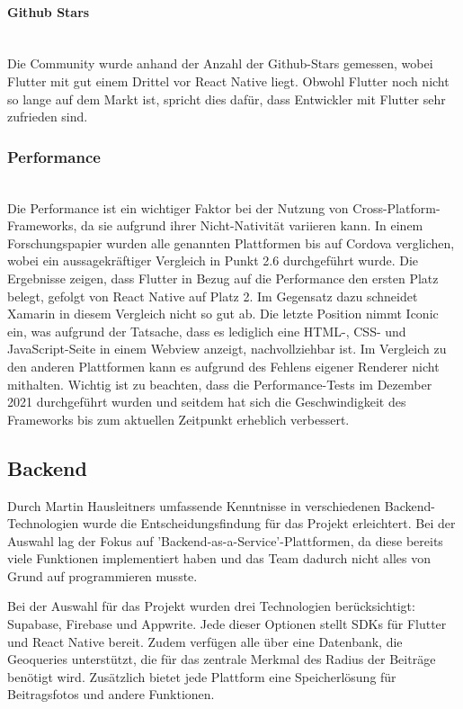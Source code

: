 \paragraph{Github Stars}\mbox{} \\
Die Community wurde anhand der Anzahl der Github-Stars gemessen, wobei Flutter mit gut einem Drittel vor React Native liegt. Obwohl Flutter noch nicht so lange auf dem Markt ist, spricht dies dafür, dass Entwickler mit Flutter sehr zufrieden sind.

\subsubsection{Performance}\mbox{} \\
Die Performance ist ein wichtiger Faktor bei der Nutzung von Cross-Platform-Frameworks, da sie aufgrund ihrer Nicht-Nativität variieren kann. In einem Forschungspapier \cite{Anwar2021} wurden alle genannten Plattformen bis auf Cordova verglichen, wobei ein aussagekräftiger Vergleich in Punkt 2.6 durchgeführt wurde. Die Ergebnisse zeigen, dass Flutter in Bezug auf die Performance den ersten Platz belegt, gefolgt von React Native auf Platz 2. Im Gegensatz dazu schneidet Xamarin in diesem Vergleich nicht so gut ab. Die letzte Position nimmt Iconic ein, was aufgrund der Tatsache, dass es lediglich eine HTML-, CSS- und JavaScript-Seite in einem Webview anzeigt, nachvollziehbar ist. Im Vergleich zu den anderen Plattformen kann es aufgrund des Fehlens eigener Renderer nicht mithalten.
Wichtig ist zu beachten, dass die Performance-Tests im Dezember 2021 durchgeführt wurden und seitdem hat sich die Geschwindigkeit des Frameworks bis zum aktuellen Zeitpunkt erheblich verbessert.


\subsection
{Backend}
Durch Martin Hausleitners umfassende Kenntnisse in verschiedenen Backend-Technologien wurde die Entscheidungsfindung für das Projekt erleichtert. Bei der Auswahl lag der Fokus auf 'Backend-as-a-Service'-Plattformen, da diese bereits viele Funktionen implementiert haben und das Team dadurch nicht alles von Grund auf programmieren musste.

Bei der Auswahl für das Projekt wurden drei Technologien berücksichtigt: Supabase, Firebase und Appwrite. Jede dieser Optionen stellt SDKs für Flutter und React Native bereit. Zudem verfügen alle über eine Datenbank, die Geoqueries unterstützt, die für das zentrale Merkmal des Radius der Beiträge benötigt wird. Zusätzlich bietet jede Plattform eine Speicherlösung für Beitragsfotos und andere Funktionen.

